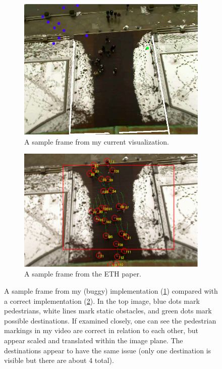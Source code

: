 \documentclass[a4paper,11pt,headings=small]{article}
\begin{document}
\begin{figure}[htbp]
\centering
\begin{subfigure}[b]{0.8\textwidth}
\centering
\includegraphics[width=\textwidth]{dataset-bug.png}
\caption{A sample frame from my current visualization.}
\label{a}
\end{subfigure}
\begin{subfigure}[b]{0.8\textwidth}
\centering
\includegraphics[width=\textwidth]{dataset-example.png}
\caption{A sample frame from the ETH paper.\cite{Pellegrini2009}}
\label{b}
\end{subfigure}
\caption{A sample frame from my (buggy) implementation (\ref{a}) compared with a correct implementation (\ref{b}). In the top image, blue dots mark pedestrians, white lines mark static obstacles, and green dots mark possible destinations. If examined closely, one can see the pedestrian markings in my video are correct in relation to each other, but appear scaled and translated within the image plane. The destinations appear to have the same issue (only one destination is visible but there are about 4 total).}
\label{bug}
\end{figure}
\end{document}
